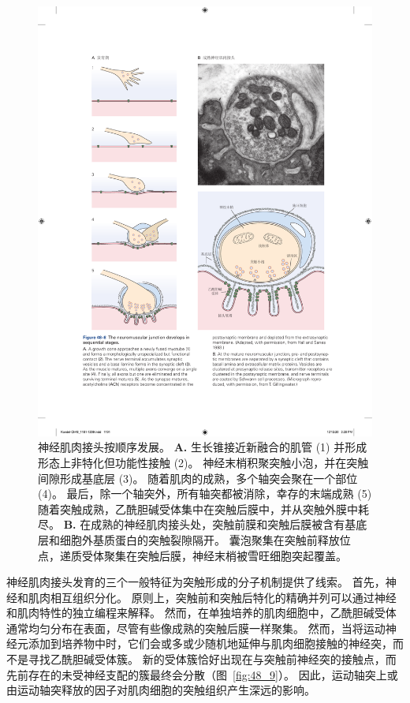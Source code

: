 \begin{figure}[htbp]
	\centering
	\includegraphics[width=0.9\linewidth]{chap48/fig_48_8}
	\caption{神经肌肉接头按顺序发展。
		\textbf{A.} 生长锥接近新融合的肌管 (1) 并形成形态上非特化但功能性接触 (2)。
		神经末梢积聚突触小泡，并在突触间隙形成基底层 (3)。
		随着肌肉的成熟，多个轴突会聚在一个部位 (4)。
		最后，除一个轴突外，所有轴突都被消除，幸存的末端成熟 (5)随着突触成熟，乙酰胆碱受体集中在突触后膜中，并从突触外膜中耗尽\cite{hall1993synaptic}。
		\textbf{B.} 在成熟的神经肌肉接头处，突触前膜和突触后膜被含有基底层和细胞外基质蛋白的突触裂隙隔开。
		囊泡聚集在突触前释放位点，递质受体聚集在突触后膜，神经末梢被雪旺细胞突起覆盖。}
	\label{fig:48_8}
\end{figure}


神经肌肉接头发育的三个一般特征为突触形成的分子机制提供了线索。 
首先，神经和肌肉相互组织分化。
原则上，突触前和突触后特化的精确并列可以通过神经和肌肉特性的独立编程来解释。
然而，在单独培养的肌肉细胞中，乙酰胆碱受体通常均匀分布在表面，尽管有些像成熟的突触后膜一样聚集。
然而，当将运动神经元添加到培养物中时，它们会或多或少随机地延伸与肌肉细胞接触的神经突，而不是寻找乙酰胆碱受体簇。
新的受体簇恰好出现在与突触前神经突的接触点，而先前存在的未受神经支配的簇最终会分散（图~\ref{fig:48_9}）。
因此，运动轴突上或由运动轴突释放的因子对肌肉细胞的突触组织产生深远的影响。


